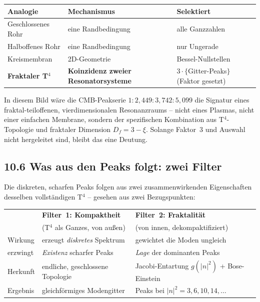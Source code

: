 \begin{center}
\begin{tabular}{p{3.5cm}p{3.5cm}p{5cm}}
\toprule
\textbf{Analogie} & \textbf{Mechanismus} & \textbf{Selektiert} \\
\midrule
Geschlossenes Rohr & eine Randbedingung & alle Ganzzahlen \\
Halboffenes Rohr & eine Randbedingung & nur Ungerade \\
Kreismembran & 2D-Geometrie & Bessel-Nullstellen \\
\midrule
\textbf{Fraktaler T$^4$} &
  \textbf{Koinzidenz zweier} \newline \textbf{Resonatorsysteme} &
  $3 \cdot \{$Gitter-Peaks$\}$ (Faktor gesetzt) \\
\bottomrule
\end{tabular}
\end{center}

In diesem Bild wäre die CMB-Peakserie $1:2{,}449:3{,}742:5{,}099$ die
Signatur eines fraktal-teiloffenen, vierdimensionalen Resonanzraums --
nicht eines Plasmas, nicht einer einfachen Membrane, sondern der
spezifischen Kombination aus T$^4$-Topologie und fraktaler Dimension
$D_f = 3 - \xi$. Solange Faktor~3 und Auswahl nicht hergeleitet sind,
bleibt das eine Deutung.

\subsection*{10.6 Was aus den Peaks folgt: zwei Filter}

Die diskreten, scharfen Peaks folgen aus zwei zusammenwirkenden
Eigenschaften desselben vollständigen T$^4$ -- gesehen aus zwei
Bezugspunkten:

\begin{center}
\begin{tabular}{p{2.2cm}p{4.6cm}p{4.6cm}}
\toprule
 & \textbf{Filter~1: Kompaktheit} & \textbf{Filter~2: Fraktalität} \\
 & (T$^4$ als Ganzes, von außen) & (von innen, dekompaktifiziert) \\
\midrule
Wirkung & erzeugt \emph{diskretes} Spektrum &
  gewichtet die Moden ungleich \\
\addlinespace
erzwingt & \emph{Existenz} scharfer Peaks &
  \emph{Lage} der dominanten Peaks \\
\addlinespace
Herkunft & endliche, geschlossene Topologie &
  Jacobi-Entartung $g(|n|^2)$ + Bose-Einstein \\
\addlinespace
Ergebnis & gleichförmiges Modengitter &
  Peaks bei $|n|^2 = 3, 6, 10, 14, \ldots$ \\
\bottomrule
\end{tabular}
\end{center}

